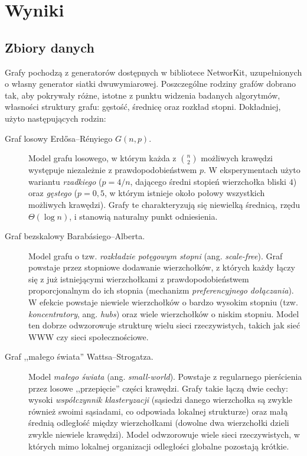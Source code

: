 \section{Wyniki}

\subsection{Zbiory danych}
Grafy pochodzą
z generatorów dostępnych w bibliotece NetworKit, uzupełnionych o własny generator
siatki dwuwymiarowej. Poszczególne rodziny grafów dobrano tak, aby pokrywały
różne, istotne z punktu widzenia badanych algorytmów, własności struktury grafu:
gęstość, średnicę oraz rozkład stopni. Dokładniej, użyto następujących rodzin:

\begin{description}
    \item[Graf losowy Erdősa--Rényiego $G(n,p)$.]  Model grafu losowego,
        w którym każda z $\binom{n}{2}$ możliwych krawędzi występuje niezależnie
        z prawdopodobieństwem $p$. W eksperymentach użyto wariantu \emph{rzadkiego}
        ($p = 4/n$, dającego średni stopień wierzchołka bliski $4$) oraz
        \emph{gęstego} ($p = 0{,}5$, w którym istnieje około połowy wszystkich
        możliwych krawędzi). Grafy te charakteryzują się niewielką średnicą,
        rzędu $\Theta(\log n)$, i stanowią naturalny punkt odniesienia.

    \item[Graf bezskalowy Barabásiego--Alberta.] Model grafu o tzw.
        \emph{rozkładzie potęgowym stopni} (ang. \emph{scale-free}). Graf powstaje
        przez stopniowe dodawanie wierzchołków, z których każdy łączy się z już
        istniejącymi wierzchołkami z prawdopodobieństwem proporcjonalnym do ich
        stopnia (mechanizm \emph{preferencyjnego dołączania}). W efekcie powstaje
        niewiele wierzchołków o bardzo wysokim stopniu (tzw. \emph{koncentratory},
        ang. \emph{hubs}) oraz wiele wierzchołków o niskim stopniu. Model ten
        dobrze odwzorowuje strukturę wielu sieci rzeczywistych, takich jak sieć
        WWW czy sieci społecznościowe.

    \item[Graf ,,małego świata'' Wattsa--Strogatza.] Model \emph{małego świata}
        (ang. \emph{small-world}). Powstaje z regularnego pierścienia przez losowe
        ,,przepięcie'' części krawędzi. Grafy takie łączą dwie cechy: wysoki
        \emph{współczynnik klasteryzacji} (sąsiedzi danego wierzchołka są zwykle
        również swoimi sąsiadami, co odpowiada lokalnej strukturze) oraz małą
        średnią odległość między wierzchołkami (dowolne dwa wierzchołki dzieli
        zwykle niewiele krawędzi). Model odwzorowuje wiele sieci rzeczywistych,
        w których mimo lokalnej organizacji odległości globalne pozostają krótkie.


\end{description}
